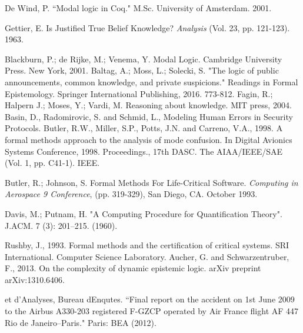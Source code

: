 \begin{thebibliography}{9}
	 	De Wind, P. ``Modal logic in Coq." M.Sc. University of Amsterdam. 2001.
	 	
	 	Gettier, E. Is Justified True Belief Knowledge? {\em Analysis} (Vol. 23, pp. 121-123). 1963.
	 	
	 	 Blackburn, P.; de Rijke, M.; Venema, Y. Modal Logic. Cambridge University Press. New York, 2001.
	 	 Baltag, A.; Moss, L.; Solecki, S. "The logic of public announcements, common knowledge, and private suspicions." Readings in Formal Epistemology. Springer International Publishing, 2016. 773-812.
	 	 Fagin, R.; Halpern J.; Moses, Y.; Vardi, M. Reasoning about knowledge. MIT press, 2004.
	 	 Basin, D., Radomirovic, S. and Schmid, L., Modeling Human Errors in Security Protocols.
	 	 Butler, R.W., Miller, S.P., Potts, J.N. and Carreno, V.A., 1998. A formal methods approach to the analysis of mode confusion. In Digital Avionics Systems Conference, 1998. Proceedings., 17th DASC. The AIAA/IEEE/SAE (Vol. 1, pp. C41-1). IEEE.
	 	
	 	Butler, R.; Johnson, S. Formal Methods For Life-Critical Software. \emph{Computing in Aerospace 9 Conference}, (pp. 319-329), San Diego, CA. October 1993.
	 	
	 	Davis, M.; Putnam, H. "A Computing Procedure for Quantification Theory". J.ACM. 7 (3): 201–215. (1960).
	 	
	 	 Rushby, J., 1993. Formal methods and the certification of critical systems. SRI International. Computer Science Laboratory.
	 	 Aucher, G. and Schwarzentruber, F., 2013. On the complexity of dynamic epistemic logic. arXiv preprint arXiv:1310.6406.
	 	
	 	
	 	
	 	et d'Analyses, Bureau dEnqutes. ``Final report on the accident on 1st June 2009 to the Airbus A330-203 registered F-GZCP operated by Air France flight AF 447 Rio de Janeiro–Paris." Paris: BEA (2012).
	 	

\end{thebibliography}
